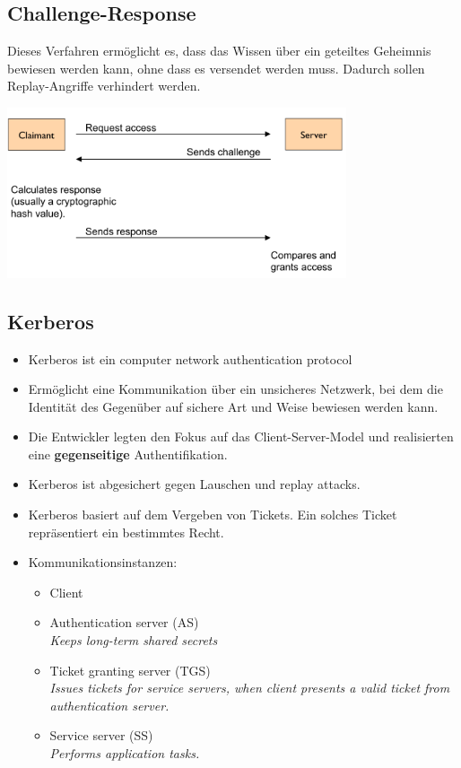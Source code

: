 \documentclass{article} %
\begin{document}
\subsection{Challenge-Response}
Dieses Verfahren ermöglicht es, dass das Wissen über ein geteiltes Geheimnis bewiesen werden kann, ohne dass es versendet werden muss. Dadurch sollen Replay-Angriffe verhindert werden.
	\begin{center}
		\includegraphics[width=10cm]{img/challResp.png}
	\end{center}

\subsection{Kerberos}	
	\begin{itemize}
	\item Kerberos ist ein computer network authentication protocol
	\item Ermöglicht eine Kommunikation über ein unsicheres Netzwerk, bei dem die Identität des Gegenüber auf sichere Art und Weise bewiesen werden kann.
	\item Die Entwickler legten den Fokus auf das Client-Server-Model und realisierten eine \textbf{gegenseitige} Authentifikation.
	\item Kerberos ist abgesichert gegen Lauschen und replay attacks.
	\item Kerberos basiert auf dem Vergeben von Tickets. Ein solches Ticket repräsentiert ein bestimmtes Recht.
	\item Kommunikationsinstanzen:
		\begin{itemize}
		\item Client
		\item Authentication server (AS)\\
		\textit{Keeps long-term shared secrets}
		\item Ticket granting server (TGS)\\
		\textit{Issues tickets for service servers, when client presents a valid ticket from authentication server.}
		\item Service server (SS)\\
		\textit{Performs application tasks.}
		\end{itemize}
	\end{itemize}
\end{document}
